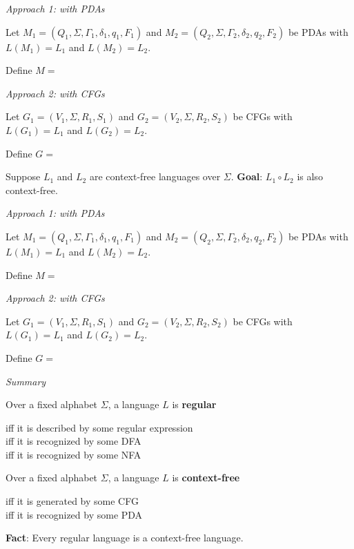 \documentclass[12pt, oneside]{article}
\begin{document}
{\it Approach 1: with  PDAs}

Let $M_1 = ( Q_1, \Sigma, \Gamma_1, \delta_1, q_1, F_1)$ and
$M_2 = ( Q_2, \Sigma, \Gamma_2, \delta_2, q_2, F_2)$ be PDAs with 
$L(M_1) =  L_1$  and  $L(M_2) = L_2$.

Define $M = $

\vfill

{\it Approach  2: with CFGs}

Let $G_1 = (V_1, \Sigma, R_1, S_1)$  and   $G_2 = (V_2, \Sigma, R_2, S_2)$  be CFGs  with
$L(G_1) =  L_1$  and  $L(G_2) = L_2$.

Define $G = $

\vfill

\newpage
Suppose $L_1$ and $L_2$ are context-free languages over $\Sigma$.  {\bf Goal}:  $L_1 \circ L_2$  is  also context-free.


{\it Approach 1: with  PDAs}

Let $M_1 = ( Q_1, \Sigma, \Gamma_1, \delta_1, q_1, F_1)$ and
$M_2 = ( Q_2, \Sigma, \Gamma_2, \delta_2, q_2, F_2)$ be PDAs with 
$L(M_1) =  L_1$  and  $L(M_2) = L_2$.

Define $M = $

\vfill

{\it Approach  2: with CFGs}

Let $G_1 = (V_1, \Sigma, R_1, S_1)$  and   $G_2 = (V_2, \Sigma, R_2, S_2)$  be CFGs  with
$L(G_1) =  L_1$  and  $L(G_2) = L_2$.

Define $G = $

\vfill
\newpage
{\it Summary}

Over a fixed alphabet $\Sigma$, a language $L$ is {\bf regular}

\vspace{-20pt}
\begin{center}
    iff it is described by some regular expression \\
    iff it is recognized by some DFA\\
    iff it is recognized by some NFA
\end{center}

Over a fixed alphabet $\Sigma$, a language $L$ is {\bf context-free}

\vspace{-20pt}
\begin{center}
    iff it is generated by some CFG\\
    iff it is recognized by some PDA
\end{center}

{\bf Fact}: Every regular language is a context-free language.
\end{document}
